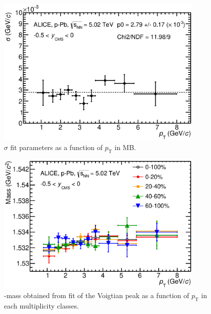 \begin{figure}[htbp]
\begin{center}
\includegraphics[width=10.0cm]{./Version1/FigChapter5/Extraction/WidthMB.eps}
\caption{$\sigma$ fit parameters as a function of $p_{\mathrm{T}}$ in MB.} 
 \label{fig:pPb:sigma}
\end{center}
\end{figure}

\begin{figure}[htbp]
\begin{center}
\includegraphics[width=10.0cm]{./Version1/FigChapter5/Extraction/Mass.eps}
\caption{\xis-mass obtained from fit of the Voigtian peak as a function of $p_{\mathrm{T}}$ in each multiplicity classes.} 
 \label{fig:pPb:mass}
\end{center}
\end{figure}

